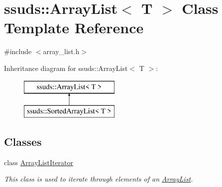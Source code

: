\hypertarget{classssuds_1_1_array_list}{}\section{ssuds\+::Array\+List$<$ T $>$ Class Template Reference}
\label{classssuds_1_1_array_list}


{\ttfamily \#include $<$array\+\_\+list.\+h$>$}

Inheritance diagram for ssuds\+::Array\+List$<$ T $>$\+:\begin{figure}[H]
\begin{center}
\leavevmode
\includegraphics[height=2.000000cm]{classssuds_1_1_array_list}
\end{center}
\end{figure}
\subsection*{Classes}
\begin{DoxyCompactItemize}
\item 
class \mbox{\hyperlink{classssuds_1_1_array_list_1_1_array_list_iterator}{Array\+List\+Iterator}}
\begin{DoxyCompactList}\small\item\em This class is used to iterate through elements of an \mbox{\hyperlink{classssuds_1_1_array_list}{Array\+List}}. \end{DoxyCompactList}\end{DoxyCompactItemize}
